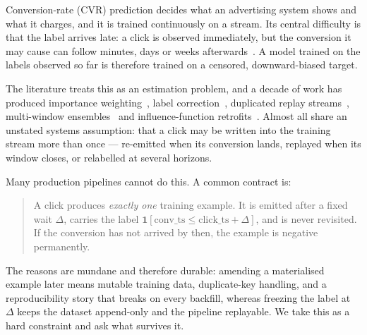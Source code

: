 \documentclass[runningheads]{llncs}
\newcommand{\ind}{\mathbf{1}}
\begin{document}
Conversion-rate (CVR) prediction decides what an advertising system shows and what it charges, and
it is trained continuously on a stream. Its central difficulty is that the label arrives late: a
click is observed immediately, but the conversion it may cause can follow minutes, days or weeks
afterwards~\cite{chapelle2014modeling}. A model trained on the labels observed so far is therefore
trained on a censored, downward-biased target.

The literature treats this as an estimation problem, and a decade of work has produced importance
weighting~\cite{yasui2020feedback,yang2021capturing}, label
correction~\cite{chen2022asymptotically,wang2023unbiased}, duplicated replay
streams~\cite{ktena2019addressing,gu2021real,dai2023dually}, multi-window
ensembles~\cite{li2021follow,liu2024online,zhang2025personalized} and influence-function
retrofits~\cite{ding2026delayed}. Almost all share an unstated systems assumption: that a click may
be written into the training stream more than once --- re-emitted when its conversion lands,
replayed when its window closes, or relabelled at several horizons.

Many production pipelines cannot do this. A common contract is:

\begin{quote}
A click produces \emph{exactly one} training example. It is emitted after a fixed wait $\Delta$,
carries the label $\ind[\text{conv\_ts} \le \text{click\_ts} + \Delta]$, and is never revisited. If
the conversion has not arrived by then, the example is negative permanently.
\end{quote}

The reasons are mundane and therefore durable: amending a materialised example later means mutable
training data, duplicate-key handling, and a reproducibility story that breaks on every backfill,
whereas freezing the label at $\Delta$ keeps the dataset append-only and the pipeline replayable. We
take this as a hard constraint and ask what survives it.
\end{document}

